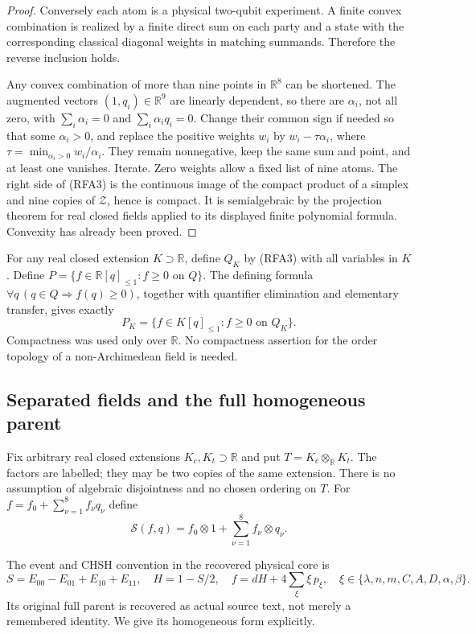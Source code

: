 \begin{proof}
Conversely each atom is a physical two-qubit experiment. A finite convex
combination is realized by a finite direct sum on each party and a state
with the corresponding classical diagonal weights in matching summands.
Therefore the reverse inclusion holds.

Any convex combination of more than nine points in $\mathbb R^8$ can be
shortened. The augmented vectors $(1,q_i)\in\mathbb R^9$ are linearly
dependent, so there are $\alpha_i$, not all zero, with
$\sum_i\alpha_i=0$ and $\sum_i\alpha_iq_i=0$. Change their common sign if
needed so that some $\alpha_i>0$, and replace the positive weights $w_i$
by $w_i-\tau\alpha_i$, where
$\tau=\min_{\alpha_i>0}w_i/\alpha_i$. They remain nonnegative, keep the
same sum and point, and at least one vanishes. Iterate. Zero weights
allow a fixed list of nine atoms. The right side of (RFA3) is the
continuous image of the compact product of a simplex and nine copies of
$\mathcal Z$, hence is compact. It is semialgebraic by the projection
theorem for real closed fields applied to its displayed finite polynomial
formula. Convexity has already been proved.
\end{proof}

For any real closed extension $K\supset\mathbb R$, define $Q_K$ by
(RFA3) with all variables in $K$. Define
$P=\{f\in\mathbb R[q]_{\leq1}:f\geq0\text{ on }Q\}$.
The defining formula
$\forall q\,(q\in Q\Rightarrow f(q)\geq0)$, together with quantifier
elimination and elementary transfer, gives exactly
\[
 P_K=\{f\in K[q]_{\leq1}:f\geq0\text{ on }Q_K\}.
 \tag{RFA6}
\]
Compactness was used only over $\mathbb R$. No compactness assertion for
the order topology of a non-Archimedean field is needed.

\subsection{Separated fields and the full homogeneous parent}

Fix arbitrary real closed extensions $K_c,K_t\supset\mathbb R$ and put
$T=K_c\otimes_{\mathbb R}K_t$. The factors are labelled; they may be two
copies of the same extension. There is no assumption of algebraic
disjointness and no chosen ordering on $T$. For
$f=f_0+\sum_{\nu=1}^8f_\nu q_\nu$ define
\[
 \mathscr S(f,q)=f_0\otimes1+\sum_{\nu=1}^8f_\nu\otimes q_\nu.
 \tag{RFA7}
\]

The event and CHSH convention in the recovered physical core is
\[
 S=E_{00}-E_{01}+E_{10}+E_{11},\quad H=1-S/2,\quad
 f=dH+4\sum_{\xi}\xi\,p_\xi,
 \quad \xi\in\{\lambda,n,m,C,A,D,\alpha,\beta\}.
 \tag{RFA8}
\]
Its original full parent is recovered as actual source text, not merely
a remembered identity. We give its homogeneous form explicitly.

